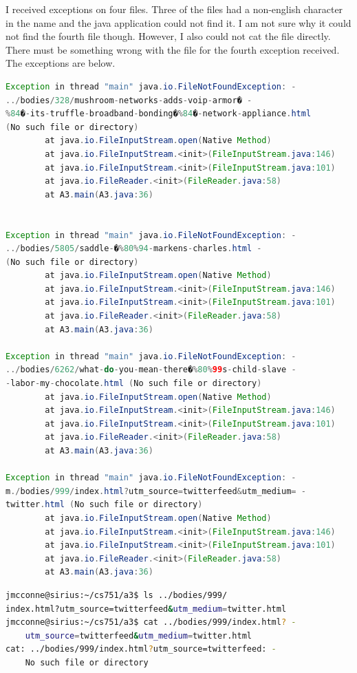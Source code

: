 \documentclass[12pt]{article}
\begin{document}
I received exceptions on four files.  Three of the files had a non-english character in the name and the java application could not find it.  I am not sure why it could not find the fourth file though.  However, I also could not cat the file directly.  There must be something wrong with the file for the fourth exception received. The exceptions are below.

\begin{lstlisting}[language=Java]
Exception in thread "main" java.io.FileNotFoundException: -
../bodies/328/mushroom-networks-adds-voip-armor� - 
%84�-its-truffle-broadband-bonding�%84�-network-appliance.html 
(No such file or directory)
        at java.io.FileInputStream.open(Native Method)
        at java.io.FileInputStream.<init>(FileInputStream.java:146)
        at java.io.FileInputStream.<init>(FileInputStream.java:101)
        at java.io.FileReader.<init>(FileReader.java:58)
        at A3.main(A3.java:36)


Exception in thread "main" java.io.FileNotFoundException: -
../bodies/5805/saddle-�%80%94-markens-charles.html -
(No such file or directory)
        at java.io.FileInputStream.open(Native Method)
        at java.io.FileInputStream.<init>(FileInputStream.java:146)
        at java.io.FileInputStream.<init>(FileInputStream.java:101)
        at java.io.FileReader.<init>(FileReader.java:58)
        at A3.main(A3.java:36)

Exception in thread "main" java.io.FileNotFoundException: -
../bodies/6262/what-do-you-mean-there�%80%99s-child-slave -
-labor-my-chocolate.html (No such file or directory)
        at java.io.FileInputStream.open(Native Method)
        at java.io.FileInputStream.<init>(FileInputStream.java:146)
        at java.io.FileInputStream.<init>(FileInputStream.java:101)
        at java.io.FileReader.<init>(FileReader.java:58)
        at A3.main(A3.java:36)

Exception in thread "main" java.io.FileNotFoundException: -
m./bodies/999/index.html?utm_source=twitterfeed&utm_medium= -
twitter.html (No such file or directory)
        at java.io.FileInputStream.open(Native Method)
        at java.io.FileInputStream.<init>(FileInputStream.java:146)
        at java.io.FileInputStream.<init>(FileInputStream.java:101)
        at java.io.FileReader.<init>(FileReader.java:58)
        at A3.main(A3.java:36)
\end{lstlisting}

\begin{lstlisting}[language=bash]
jmcconne@sirius:~/cs751/a3$ ls ../bodies/999/
index.html?utm_source=twitterfeed&utm_medium=twitter.html
jmcconne@sirius:~/cs751/a3$ cat ../bodies/999/index.html? -
    utm_source=twitterfeed&utm_medium=twitter.html
cat: ../bodies/999/index.html?utm_source=twitterfeed: -
    No such file or directory
\end{lstlisting}
\end{document}
